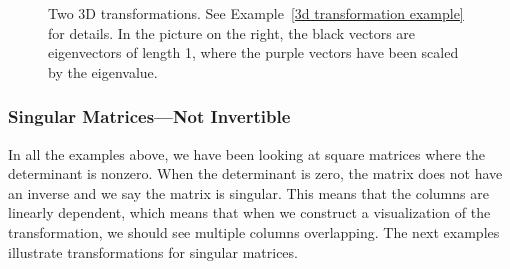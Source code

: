 \begin{example}
\begin{figure}
\begin{center}
\end{center}

\caption{{
Two 3D transformations. See Example~\ref{3d transformation example} for details. In the picture on the right, the black vectors are eigenvectors of length 1, where the purple vectors have been scaled by the eigenvalue.}}
\label{matrix transformation 3d example}
\end{figure}
\end{example}

\subsubsection{Singular Matrices---Not Invertible}

In all the examples above, we have been looking at square matrices where the determinant is nonzero.  When the determinant is zero, the matrix does not have an inverse and we say the matrix is singular.  This means that the columns are linearly dependent, which means that when we construct a visualization of the transformation, we should see multiple columns overlapping. The next examples illustrate transformations for singular matrices.

